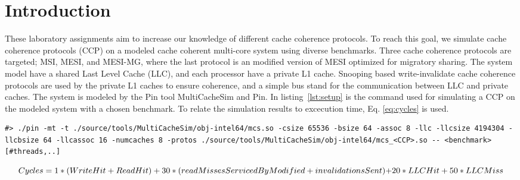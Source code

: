 \section{Introduction}
\label{sec:int}
These laboratory assignments aim to increase our knowledge of different cache coherence protocols. To reach this goal, we simulate cache coherence protocols (CCP) on a modeled cache coherent multi-core system using diverse benchmarks. Three cache coherence protocols are targeted; MSI, MESI, and MESI-MG, where the last protocol is an modified version of MESI optimized for migratory sharing. The system model have a shared Last Level Cache (LLC), and each processor have a private L1 cache. Snooping based write-invalidate cache coherence protocols are used by the private L1 caches to ensure coherence, and a simple bus stand for the communication between LLC and private caches. The system is modeled by the Pin tool MultiCacheSim and Pin. In listing~\ref{lst:setup} is the command used for simulating a CCP on the modeled system with a chosen benchmark. To relate the simulation results to excecution time, Eq. \ref{eq:cycles} is used. 



\begin{lstlisting}[label=lst:setup, basicstyle=\scriptsize, caption={Command used for simulation.}]
#> ./pin -mt -t ./source/tools/MultiCacheSim/obj-intel64/mcs.so -csize 65536 -bsize 64 -assoc 8 -llc -llcsize 4194304 -llcbsize 64 -llcassoc 16 -numcaches 8 -protos ./source/tools/MultiCacheSim/obj-intel64/mcs_<CCP>.so -- <benchmark> [#threads,..]
\end{lstlisting}
\begin{equation}
	$$\label{eq:cycles}$$
	Cycles = 1 * (WriteHit+ReadHit) + 30 * (readMissesServicedByModified + invalidationsSent)$$ $$+ 20 * LLCHit + 50 * LLCMiss
\end{equation}